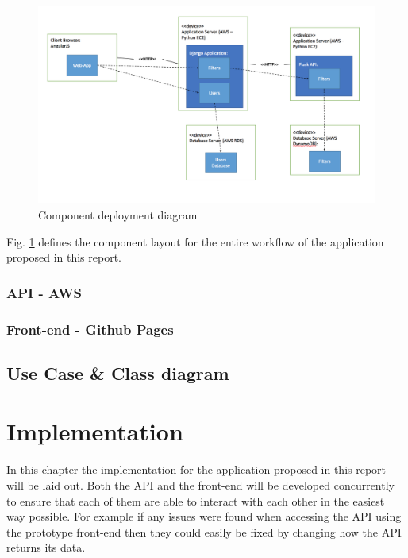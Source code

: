 \documentclass[a4paper,12pt]{report}
\begin{document}
    \begin{figure}[ht]
      \centering
      \includegraphics[width=\linewidth]{deployment-diagram}
      \caption{Component deployment diagram}
      \label{fig:deployment-diagram}
    \end{figure}

    Fig. \ref{fig:deployment-diagram} defines the component layout for the entire workflow of the application proposed in this report.

    \subsection{API - AWS}

    \subsection{Front-end - Github Pages}

  \section{Use Case \& Class diagram}


\chapter{Implementation} \label{cha:implement}
  In this chapter the implementation for the application proposed in this report will be laid out. Both the API and the front-end will be developed concurrently to ensure that each of them are able to interact with each other in the easiest way possible. For example if any issues were found when accessing the API using the prototype front-end then they could easily be fixed by changing how the API returns its data.
\end{document}
